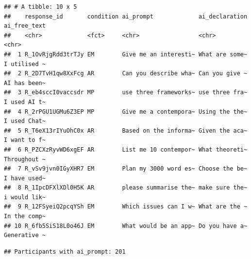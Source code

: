\documentclass[
]{article}
\newenvironment{Shaded}{\begin{snugshade}}{\end{snugshade}}
\newcommand{\CommentTok}[1]{\textcolor[rgb]{0.56,0.35,0.01}{\textit{#1}}}
\newcommand{\FunctionTok}[1]{\textcolor[rgb]{0.13,0.29,0.53}{\textbf{#1}}}
\newcommand{\NormalTok}[1]{#1}
\newcommand{\OtherTok}[1]{\textcolor[rgb]{0.56,0.35,0.01}{#1}}
\newcommand{\SpecialCharTok}[1]{\textcolor[rgb]{0.81,0.36,0.00}{\textbf{#1}}}
\newcommand{\StringTok}[1]{\textcolor[rgb]{0.31,0.60,0.02}{#1}}
\begin{document}
\begin{verbatim}
## # A tibble: 10 x 5
##    response_id       condition ai_prompt             ai_declaration ai_free_text
##    <chr>             <fct>     <chr>                 <chr>          <chr>       
##  1 R_1OvRjgRdd3trTJy EM        Give me an interesti~ What are some~ I utilised ~
##  2 R_2D7TvH1qw8XxFcg AR        Can you describe wha~ Can you give ~ AI has been~
##  3 R_eb4sccI0vaccsdr MP        use three frameworks~ use three fra~ I used AI t~
##  4 R_2rPGU1UGMu6Z3EP MP        Give me a contempora~ Using the the~ I used Chat~
##  5 R_T6eX13rIYuOhC0x AR        Based on the informa~ Given the aca~ I want to f~
##  6 R_PZCXzRyvWD6xgEF AR        List me 10 contempor~ What theoreti~ Throughout ~
##  7 R_vSv9jvn0IGyXHR7 EM        Plan my 3000 word es~ Choose the be~ I have used~
##  8 R_1IpcDFXlXDl0H5K AR        please summarise the~ make sure the~ i would lik~
##  9 R_12FSyeiQ2pcqYSh EM        Which issues can I w~ What are the ~ In the comp~
## 10 R_6fb5SiS18L0o46J EM        What would be an app~ Do you have a~ Generative ~
\end{verbatim}

\begin{Shaded}
\end{Shaded}

\begin{verbatim}
## Participants with ai_prompt: 201
\end{verbatim}

\begin{Shaded}
\end{Shaded}
\end{document}
